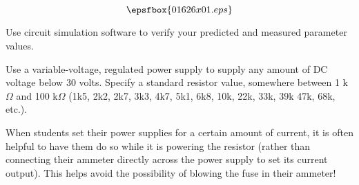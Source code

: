 

$$\epsfbox{01626x01.eps}$$

\vfil \eject






Use circuit simulation software to verify your predicted and measured parameter values.







Use a variable-voltage, regulated power supply to supply any amount of DC voltage below 30 volts.  Specify a standard resistor value, somewhere between 1 k$\Omega$ and 100 k$\Omega$ (1k5, 2k2, 2k7, 3k3, 4k7, 5k1, 6k8, 10k, 22k, 33k, 39k 47k, 68k, etc.).

\vskip 10pt

When students set their power supplies for a certain amount of current, it is often helpful to have them do so while it is powering the resistor (rather than connecting their ammeter directly across the power supply to set its current output).  This helps avoid the possibility of blowing the fuse in their ammeter!




